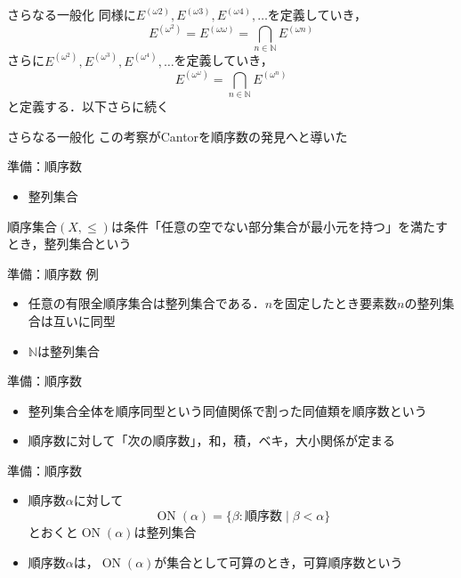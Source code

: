 \documentclass[dvipdfmx,17pt]{beamer}
\theoremstyle{plain}
\newcommand{\N}{\mathbb{N}}
\begin{document}
\begin{frame}{さらなる一般化}
同様に$E^{(\omega 2)}, E^{(\omega 3)}, E^{(\omega 4)}, \dots$を定義していき，
\[E^{(\omega^2)} = E^{(\omega \omega)} = \bigcap_{n\in\N} E^{(\omega n)}\]
さらに$E^{(\omega^2)}, E^{(\omega^3)}, E^{(\omega^4)}, \dots$を定義していき，
\[E^{(\omega^\omega)} = \bigcap_{n\in\N} E^{(\omega^n)}\]
と定義する．以下さらに続く
\end{frame}

\begin{frame}{さらなる一般化}
この考察がCantorを順序数の発見へと導いた
\end{frame}

\begin{frame}{準備：順序数}
\begin{itemize}
\item 整列集合
\end{itemize}

順序集合$(X, \leq)$は条件「任意の空でない部分集合が最小元を持つ」を満たすとき，整列集合という
\end{frame}

\begin{frame}{準備：順序数}
例
\begin{itemize}
\item 任意の有限全順序集合は整列集合である．$n$を固定したとき要素数$n$の整列集合は互いに同型
\item $\N$は整列集合
\end{itemize}
\end{frame}

\begin{frame}{準備：順序数}
\begin{itemize}
\item 整列集合全体を順序同型という同値関係で割った同値類を順序数という
\item 順序数に対して「次の順序数」，和，積，ベキ，大小関係が定まる
\end{itemize}
\end{frame}

\begin{frame}{準備：順序数}
\begin{itemize}
\item 順序数$\alpha$に対して
\[\operatorname{ON}(\alpha) = \{\beta: \text{順序数} \mid \beta < \alpha \}\]
とおくと$\operatorname{ON}(\alpha)$は整列集合
\item 順序数$\alpha$は，$\operatorname{ON}(\alpha)$が集合として可算のとき，可算順序数という
\end{itemize}
\end{frame}
\end{document}
